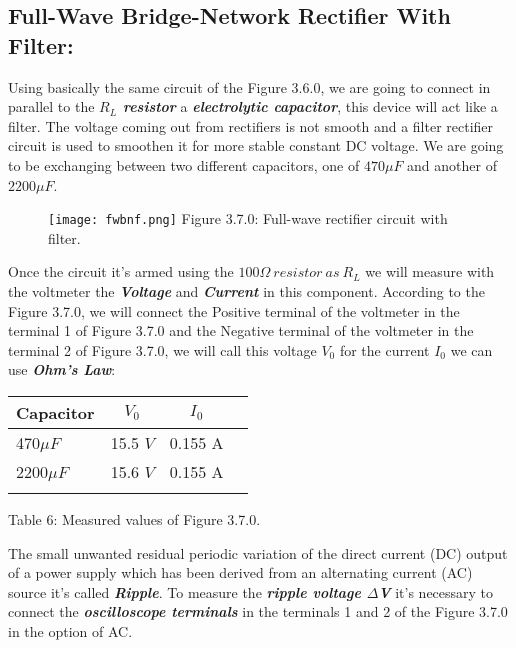 \subsection{Full-Wave Bridge-Network Rectifier With Filter:}

Using basically the same circuit of the Figure 3.6.0, we are going to connect in parallel to the {\bfseries\itshape $R_{L}$ resistor} a {\bfseries\itshape electrolytic capacitor}, this device will act like a filter. The voltage coming out from rectifiers is not smooth and a filter rectifier circuit is used to smoothen it for more stable constant DC voltage. We are going to be exchanging between two different capacitors, one of $470\mu F$ and another of $2200\mu F$.

\begin{figure}[H]
\texttt{[image: fwbnf.png]}
\centering \linebreak \linebreak Figure 3.7.0: Full-wave rectifier circuit with filter.
\end{figure} 

Once the circuit it's armed using the $100\Omega\ resistor\ as\ R_{L}$ we will measure with the voltmeter the {\bfseries\itshape Voltage} and {\bfseries\itshape Current} in this component. According to the Figure 3.7.0, we will connect the Positive terminal of the voltmeter in the terminal 1 of Figure 3.7.0 and the Negative terminal of the voltmeter in the terminal 2 of Figure 3.7.0, we will call this voltage $V_{0}$ for the current $I_{0}$ we can use {\bfseries\itshape Ohm's Law}: \hfill \break

{\bfseries\itshape{}} \hfill \break

\begin{center}
\begin{tabular}[.5cm]{l c c c}
\toprule
Capacitor & $V_{0}$ & $I_{0}$ \\
\midrule
470$\mu F$ & 15.5 $V$ & 0.155 A \\
\cmidrule{1-3}
2200$\mu F$ & 15.6 $V$ & 0.155 A \\
\bottomrule
\linebreak
\end{tabular}
\centering \linebreak Table 6: Measured values of Figure 3.7.0.
\end{center} \hfill

The small unwanted residual periodic variation of the direct current (DC) output of a power supply which has been derived from an alternating current (AC) source it's called {\bfseries\itshape Ripple}. To measure the {\bfseries\itshape ripple voltage $\Delta$V} it's necessary to connect the {\bfseries\itshape oscilloscope terminals} in the terminals 1 and 2 of the Figure 3.7.0 in the option of AC.

